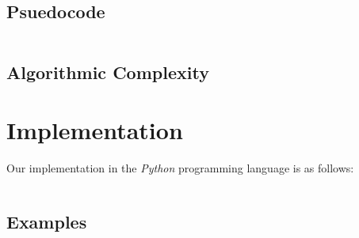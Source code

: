 \documentclass[titlepage,12pt]{article}
\begin{document}
\subsection{Psuedocode}

\inputminted{python3}{dp.py}

\subsection{Algorithmic Complexity}


\section{Implementation}

Our implementation in the \emph{Python} programming language is as follows:

\inputminted{python3}{dp.py}

\subsection{Examples}


\end{document}
